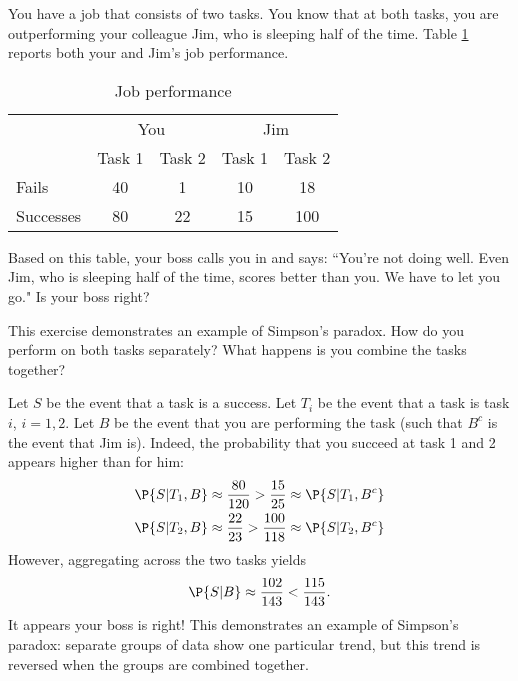 	\begin{exercise}
		You have a job that consists of two tasks. You know that at both tasks, you are outperforming your colleague Jim, who is sleeping half of the time. Table \ref{fig:chap04:02} reports both your and Jim's job performance.
		
		\begin{table}[!ht]
			\caption{Job performance}
			\label{fig:chap04:02}
			\centering
			\begin{tabular}{lcccc}
				\toprule
				& \multicolumn{2}{c}{You} & \multicolumn{2}{c}{Jim} \\
				\cmidrule(lr){2-3}\cmidrule(lr){4-5}
				& Task 1 & Task 2 & Task 1 & Task 2 \\
				\midrule
				Fails & 40 & 1 & 10 & 18 \\
				Successes & 80 & 22 & 15 & 100 \\
				\bottomrule
			\end{tabular}
		\end{table}
		Based on this table, your boss calls you in and says: ``You're not doing well. Even Jim, who is sleeping half of the time, scores better than you. We have to let you go." Is your boss right?
		\begin{hint}
			This exercise demonstrates an example of Simpson's paradox. How do you perform on both tasks separately? What happens is you combine the tasks together?
		\end{hint}
		\begin{solution}
			Let $S$ be the event that a task is a success. Let $T_i$ be the event that a task is task $i$, $i = 1, 2$. Let $B$ be the event that you are performing the task (such that $B^c$ is the event that Jim is). Indeed, the probability that you succeed at task 1 and 2 appears higher than for him:
			\begin{align*}
				\P{S | T_1, B} \approx \frac{80}{120} > \frac{15}{25} \approx \P{S | T_1, B^c} \\
				\P{S | T_2, B} \approx \frac{22}{23} > \frac{100}{118} \approx \P{S | T_2, B^c}
			\end{align*}
			However, aggregating across the two tasks yields
			\begin{align*}
				\P{S | B} \approx \frac{102}{143} < \frac{115}{143}.
			\end{align*}
			It appears your boss is right! This demonstrates an example of Simpson's paradox: separate groups of data show one particular trend, but this trend is reversed when the groups are combined together.
		\end{solution}
	\end{exercise}
